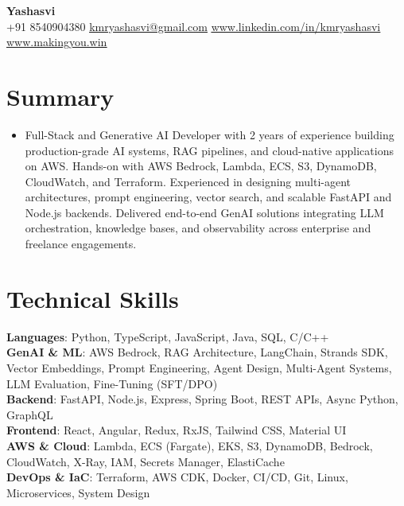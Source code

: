 \documentclass[letterpaper,11pt]{article}
\newcommand{\resumeItem}[1]{\item\small{{#1 \vspace{-2pt}}}}
\newcommand{\resumeSubHeadingListStart}{\begin{itemize}[leftmargin=0.0in, label={}]}
\newcommand{\resumeSubHeadingListEnd}{\end{itemize}}
\begin{document}
\begin{center}
    {\Huge\bfseries Yashasvi} \\ \vspace{1pt}
    \small
    +91 8540904380 \hspace{0.5em}\textbar \hspace{0.5em}
    \href{mailto:kmryashasvi@gmail.com}{\underline{kmryashasvi@gmail.com}}
    \hspace{0.5em}\textbar\hspace{0.5em}
    \href{https://linkedin.com/in/kmryashasvi}{\underline{www.linkedin.com/in/kmryashasvi}}
    \hspace{0.5em}\textbar\hspace{0.5em}
    \href{https://makingyou.win}{\underline{www.makingyou.win}}
    \vspace{-8pt}
\end{center}

\section{Summary}
\resumeSubHeadingListStart
\resumeItem{Full-Stack and Generative AI Developer with 2 years of experience building production-grade AI systems, RAG pipelines, and cloud-native applications on AWS. Hands-on with AWS Bedrock, Lambda, ECS, S3, DynamoDB, CloudWatch, and Terraform. Experienced in designing multi-agent architectures, prompt engineering, vector search, and scalable FastAPI and Node.js backends. Delivered end-to-end GenAI solutions integrating LLM orchestration, knowledge bases, and observability across enterprise and freelance engagements.}
\resumeSubHeadingListEnd
\vspace{-15pt}

\section{Technical Skills}
\begin{itemize}[leftmargin=0.15in, label={}]
\small{\item{
\textbf{Languages}{: Python, TypeScript, JavaScript, Java, SQL, C/C++} \\
\textbf{GenAI \& ML}{: AWS Bedrock, RAG Architecture, LangChain, Strands SDK, Vector Embeddings, Prompt Engineering, Agent Design, Multi-Agent Systems, LLM Evaluation, Fine-Tuning (SFT/DPO)} \\
\textbf{Backend}{: FastAPI, Node.js, Express, Spring Boot, REST APIs, Async Python, GraphQL} \\
\textbf{Frontend}{: React, Angular, Redux, RxJS, Tailwind CSS, Material UI} \\
\textbf{AWS \& Cloud}{: Lambda, ECS (Fargate), EKS, S3, DynamoDB, Bedrock, CloudWatch, X-Ray, IAM, Secrets Manager, ElastiCache} \\
\textbf{DevOps \& IaC}{: Terraform, AWS CDK, Docker, CI/CD, Git, Linux, Microservices, System Design}
}}
\end{itemize}
\vspace{-16pt}
\end{document}
